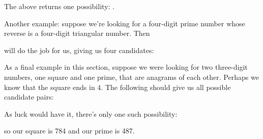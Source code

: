 \documentclass[letterpaper,10pt,english]{sphinxmanual}
\begin{document}
The above returns one possibility: .

Another example: suppose we’re looking for a four-digit prime number whose reverse is a four-digit triangular number. Then

\begin{sphinxVerbatim}[commandchars=\\\{\}]
   
      
\end{sphinxVerbatim}

will do the job for us, giving us four candidates:

\begin{sphinxVerbatim}[commandchars=\\\{\}]
\end{sphinxVerbatim}

As a final example in this section, suppose we were looking for two three-digit numbers, one square and one prime, that are anagrams of each other. Perhaps we know that the square ends in 4. The following should give us all possible candidate pairs:

\begin{sphinxVerbatim}[commandchars=\\\{\}]
   
      
         
\end{sphinxVerbatim}

As luck would have it, there’s only one such possibility:

\begin{sphinxVerbatim}[commandchars=\\\{\}]
 
\end{sphinxVerbatim}

so our square is 784 and our prime is 487.
\end{document}

